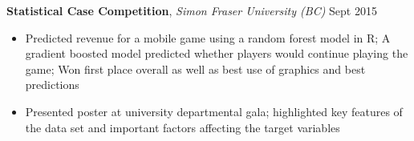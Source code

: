 \documentclass[11pt]{article}
\begin{document}
\vspace{2mm}
\begin{addmargin}[2.75em]{0em}
\textbf{Statistical Case Competition}, \textit{Simon Fraser University (BC)} \hfill Sept 2015
\end{addmargin}
%
\vspace{1mm}
\begin{addmargin}[1.75em]{0em}
\begin{itemize}
\setlength\itemsep{-0.4em}
\item Predicted revenue for a mobile game using a random forest model in R; A gradient boosted model predicted whether players would continue playing the game; Won first place overall as well as best use of graphics and best predictions
\item Presented poster at university departmental gala; highlighted key features of the data set and important factors affecting the target variables
\end{itemize}
\end{addmargin}
\end{document}
